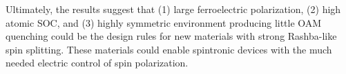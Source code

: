 Ultimately, the results suggest that (1) large ferroelectric polarization, (2) high atomic SOC, and (3) highly symmetric environment producing little OAM quenching could be the design rules for new materials with strong Rashba-like spin splitting. These materials could enable spintronic devices with the much needed electric control of spin polarization.

\printbibliography

